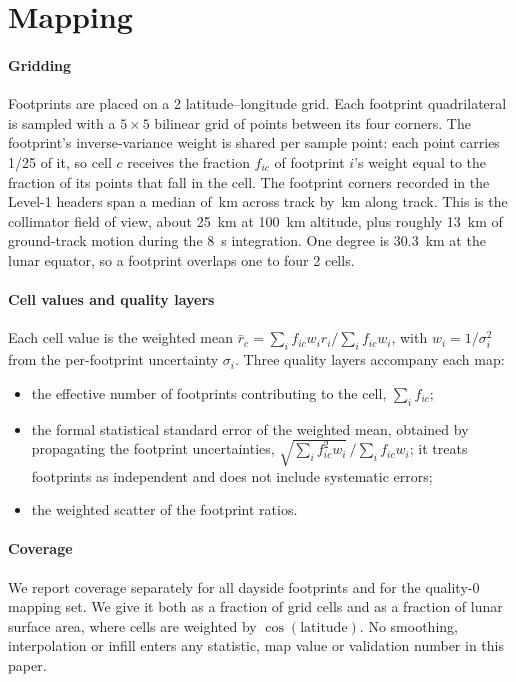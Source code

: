 \section{Mapping}\label{sec:mapping}

\paragraph{Gridding} Footprints are placed on a 2\textdegree{} latitude--longitude grid. Each footprint quadrilateral is sampled with a $5\times5$ bilinear grid of points between its four corners. The footprint's inverse-variance weight is shared per sample point: each point carries 1/25 of it, so cell $c$ receives the fraction $f_{ic}$ of footprint $i$'s weight equal to the fraction of its points that fall in the cell. The footprint corners recorded in the Level-1 headers span a median of \FootprintB{}\,km across track by \FootprintA{}\,km along track. This is the collimator field of view, about \SI{25}{km} at \SI{100}{km} altitude, plus roughly \SI{13}{km} of ground-track motion during the \SI{8}{s} integration. One degree is \SI{30.3}{km} at the lunar equator, so a footprint overlaps one to four 2\textdegree{} cells.

\paragraph{Cell values and quality layers} Each cell value is the weighted mean $\bar r_c=\sum_i f_{ic}w_i r_i/\sum_i f_{ic}w_i$, with $w_i=1/\sigma_i^2$ from the per-footprint uncertainty $\sigma_i$. Three quality layers accompany each map:
\begin{itemize}
\item the effective number of footprints contributing to the cell, $\sum_i f_{ic}$;
\item the formal statistical standard error of the weighted mean, obtained by propagating the footprint uncertainties, $\sqrt{\sum_i f_{ic}^2w_i}\,/\sum_i f_{ic}w_i$; it treats footprints as independent and does not include systematic errors;
\item the weighted scatter of the footprint ratios.
\end{itemize}

\paragraph{Coverage} We report coverage separately for all dayside footprints and for the quality-0 mapping set. We give it both as a fraction of grid cells and as a fraction of lunar surface area, where cells are weighted by $\cos(\text{latitude})$. No smoothing, interpolation or infill enters any statistic, map value or validation number in this paper.

